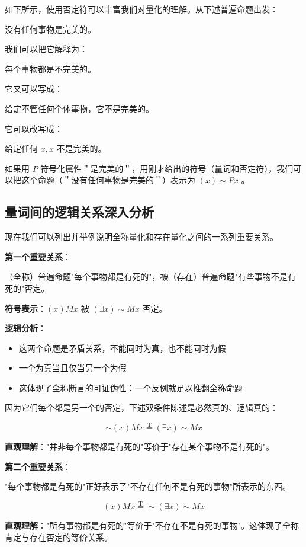 如下所示，使用否定符可以丰富我们对量化的理解。从下述普遍命题出发：

没有任何事物是完美的。

我们可以把它解释为：

每个事物都是不完美的。

它又可以写成：

给定不管任何个体事物，它不是完美的。

它可以改写成：

给定任何 $x, x$ 不是完美的。

如果用 $P$ 符号化属性＂是完美的＂，用刚才给出的符号（量词和否定符），我们可以把这个命题（＂没有任何事物是完美的＂）表示为 $(x) \sim P x$ 。

\subsection{量词间的逻辑关系深入分析}

现在我们可以列出并举例说明全称量化和存在量化之间的一系列重要关系。

\begin{theorembox}[title=量词对偶关系的第一组]
\textbf{第一个重要关系}：

（全称）普遍命题"每个事物都是有死的"，被（存在）普遍命题"有些事物不是有死的"否定。

\textbf{符号表示}：$(x)Mx$ 被 $(\exists x)\sim Mx$ 否定。

\textbf{逻辑分析}：
\begin{itemize}
\item 这两个命题是矛盾关系，不能同时为真，也不能同时为假
\item 一个为真当且仅当另一个为假
\item 这体现了全称断言的可证伪性：一个反例就足以推翻全称命题
\end{itemize}

因为它们每个都是另一个的否定，下述双条件陈述是必然真的、逻辑真的：

$$\sim(x) M x \stackrel{\mathrm{T}}{=} (\exists x) \sim M x$$

\textbf{直观理解}："并非每个事物都是有死的"等价于"存在某个事物不是有死的"。
\end{theorembox}

\begin{theorembox}[title=量词对偶关系的第二组]
\textbf{第二个重要关系}：

"每个事物都是有死的"正好表示了"不存在任何不是有死的事物"所表示的东西。

$$
(x) M x \stackrel{\mathrm{T}}{=} \sim(\exists x) \sim M x
$$

\textbf{直观理解}："所有事物都是有死的"等价于"不存在不是有死的事物"。这体现了全称肯定与存在否定的等价关系。
\end{theorembox}

